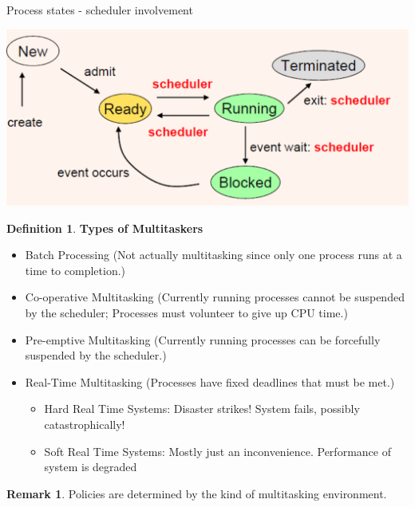 \documentclass[12pt,a4paper]{article}
\theoremstyle{definition}
\newtheorem*{remark}{Remark}
\newtheorem{definition}{Definition}[section]
\newenvironment{myitemize}
{ \begin{itemize}
    \setlength{\itemsep}{5pt}
    \setlength{\parskip}{0pt}
    \setlength{\parsep}{0pt}     }
{ \end{itemize}                  }
\begin{document}
\begin{tcolorbox}
	\textsf{Process states - scheduler involvement}
	
	\includegraphics[scale=0.4]{m1/processSchedulerStates}
	\centering
\end{tcolorbox}

\begin{definition}{\textbf{Types of Multitaskers}}
	\begin{myitemize}
		\item Batch Processing (Not actually multitasking since only one process runs at a time to completion.)
		\item Co-operative Multitasking (Currently running processes cannot be suspended by the scheduler; Processes must volunteer to give up CPU time.)
		\item Pre-emptive Multitasking (Currently running processes can be forcefully suspended by the scheduler.)
		\item Real-Time Multitasking (Processes have fixed deadlines that must be met.)
		\begin{myitemize}
			\item Hard Real Time Systems: Disaster strikes! System fails, possibly catastrophically!
			\item Soft Real Time Systems: Mostly just an inconvenience. Performance of system is degraded
		\end{myitemize}
	\end{myitemize}
\end{definition}
\begin{remark}
	Policies are determined by the kind of multitasking environment.
\end{remark}
\end{document}

